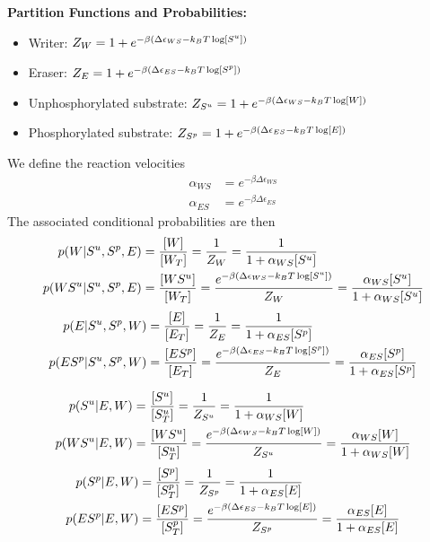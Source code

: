 \documentclass[aps,onecolumn,superscriptaddress,notitlepage]{revtex4-1}
\begin{document}
\textbf{Partition Functions and Probabilities:}
\begin{itemize}
\item Writer: $Z_W = 1 + e^{-\beta\qty(\Delta\epsilon_{WS} -k_BT \log[S^u])}$
\item Eraser: $Z_E = 1 + e^{-\beta\qty(\Delta\epsilon_{ES} -k_BT \log[S^p])}$
\item Unphosphorylated substrate: $Z_{S^u} = 1 + e^{-\beta\qty(\Delta\epsilon_{WS} -k_BT \log[W])}$
\item Phosphorylated substrate: $Z_{S^p} = 1 + e^{-\beta\qty(\Delta\epsilon_{ES} -k_BT \log[E])}$
\end{itemize}
We define the reaction velocities
\begin{align}
\alpha_{WS} &= e^{-\beta\Delta\epsilon_{WS}}\\
\alpha_{ES} &= e^{-\beta\Delta\epsilon_{ES}}
\end{align}
The associated conditional probabilities are then
\begin{align}
p(W|S^u,S^p, E) &= \frac{[W]}{[W_T]} = \frac{1}{Z_W} =  \frac{1}{1 + \alpha_{WS}[S^u]}\\
p(WS^u|S^u,S^p, E) &= \frac{[WS^u]}{[W_T]}  = \frac{e^{-\beta\qty(\Delta\epsilon_{WS} -k_BT \log[S^u])}}{Z_W} =  \frac{\alpha_{WS}[S^u]}{1 + \alpha_{WS}[S^u]}
\end{align}
\begin{align}
p(E|S^u,S^p, W) &= \frac{[E]}{[E_T]} = \frac{1}{Z_E} =  \frac{1}{1 + \alpha_{ES}[S^p]}\\
p(ES^p|S^u,S^p, W) &= \frac{[ES^p]}{[E_T]}  = \frac{e^{-\beta\qty(\Delta\epsilon_{ES} -k_BT \log[S^p])}}{Z_E} =  \frac{\alpha_{ES}[S^p]}{1 + \alpha_{ES}[S^p]}
\end{align}

\begin{align}
p(S^u|E, W) &= \frac{[S^u]}{[S^u_T]} = \frac{1}{Z_{S^u}} = \frac{1}{1 + \alpha_{WS}[W]}\\
p(WS^u|E, W) &= \frac{[WS^u]}{[S^u_T]} = \frac{ e^{-\beta\qty(\Delta\epsilon_{WS} -k_BT \log[W])}}{Z_{S^u}} = \frac{\alpha_{WS}[W]}{1 + \alpha_{WS}[W]}
\end{align}
\begin{align}
p(S^p|E, W) &= \frac{[S^p]}{[S^p_T]} = \frac{1}{Z_{S^p}} = \frac{1}{1 + \alpha_{ES}[E]}\\
p(ES^p|E, W) &= \frac{[ES^p]}{[S^p_T]} = \frac{ e^{-\beta\qty(\Delta\epsilon_{ES} -k_BT \log[E])}}{Z_{S^p}} = \frac{\alpha_{ES}[E]}{1 + \alpha_{ES}[E]}
\end{align}
\end{document}
